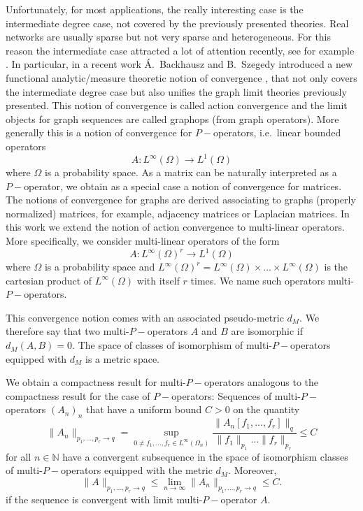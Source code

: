 \documentclass[11pt]{article}
\begin{document}
Unfortunately, for most applications, the really interesting case is the intermediate degree case, not covered by the previously presented theories. Real networks are usually sparse but not very sparse and heterogeneous. For this reason the intermediate case attracted a lot of attention recently, see for example \cite{MarkovSpaces,KUNSZENTIKOVACS20191,Kunszenti_Kov_cs_2022}.  In particular, in a recent work Á.\ Backhausz and B.\ Szegedy introduced a new functional analytic/measure theoretic notion of convergence \cite{backhausz2018action}, that not only covers the intermediate degree case but also unifies the graph limit theories previously presented. This notion of convergence is called action convergence and the limit objects for graph sequences are called graphops (from graph operators). More generally this is a notion of convergence for $P-$operators, i.e.\ linear bounded operators
$$
A:L^{\infty}(\Omega)\longrightarrow L^1(\Omega)
$$
where $\Omega$ is a probability space. As a matrix can be naturally interpreted as a $P-$operator, we obtain as a special case a notion of convergence for matrices. The notions of convergence for graphs are derived associating to graphs (properly normalized) matrices, for example, adjacency matrices or Laplacian matrices. 
In this work we extend the notion of action convergence to multi-linear operators. More specifically, we consider multi-linear operators of the form 
$$
A:L^{\infty}(\Omega)^r\longrightarrow L^1(\Omega)
$$
where $\Omega$ is a probability space and $L^{\infty}(\Omega)^r=L^{\infty}(\Omega)\times\ldots\times L^{\infty}(\Omega)$ is the cartesian product of $L^{\infty}(\Omega)$ with itself $r$ times. We name such operators multi-$P-$operators. 

This convergence notion comes with an associated pseudo-metric $d_M$. We therefore say that two multi-$P-$operators $A$ and $B$ are isomorphic if $d_M(A,B)=0$. The space of classes of isomorphism of multi-$P-$operators equipped with $d_M$ is a metric space.

We obtain a compactness result for multi-$P-$operators analogous to the compactness result for the case of $P-$operators: Sequences of multi-$P-$operators $(A_n)_{n}$ that have a uniform bound $C>0$ on the quantity
$$
\|A_n\|_{p_1,\ldots,p_{r}\rightarrow q}=\sup_{0\neq f_1,\ldots, f_r\in L^\infty(\Omega_n)}\frac{\|A_n[f_1,\ldots,f_r]\|_q}{\|f_1\|_{p_1}\ldots \|f_r\|_{p_r}}\leq C
$$
for all $n\in \mathbb{N}$ have a convergent subsequence in the space of isomorphism classes of multi-$P-$operators equipped with the metric $d_M$.  Moreover,
$$
\|A\|_{p_1,\ldots,p_{r}\rightarrow q}\leq\lim_{n\rightarrow \infty}\|A_n\|_{p_1,\ldots,p_{r}\rightarrow q}\leq C.
$$
if the sequence is convergent with limit multi-$P-$operator $A$. 
\end{document}
